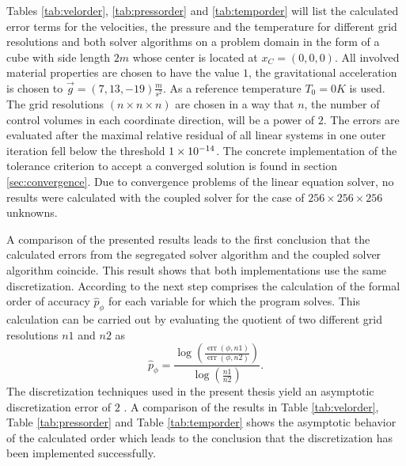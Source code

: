 Tables \ref{tab:velorder}, \ref{tab:pressorder} and \ref{tab:temporder} will list the calculated error terms for the velocities, the pressure and the temperature for different grid resolutions and both solver algorithms on a problem domain in the form of a cube with side length \(2m\) whose center is located at \(x_C = \left(0,0,0\right) \). All involved material properties are chosen to have the value \(1\), the gravitational acceleration is chosen to \(\textstyle \vec{g} = \left(7,13,-19\right)\frac{m}{s^2}\). As a reference temperature \(T_0 = 0K\) is used. The grid resolutions \((n \times n \times n)\) are chosen in a way that \(n\), the number of control volumes in each coordinate direction, will be a power of \(2\). The errors are evaluated after the maximal relative residual of all linear systems in one outer iteration fell below the threshold \(1\times 10^{-14}\). The concrete implementation of the tolerance criterion to accept a converged solution is found in section \ref{sec:convergence}. Due to convergence problems of the linear equation solver, no results were calculated with the coupled solver for the case of \(256 \times 256 \times 256 \) unknowns.

A comparison of the presented results leads to the first conclusion that the calculated errors from the segregated solver algorithm and the coupled solver algorithm coincide. This result shows that both implementations use the same discretization. According to \cite{salari00} the next step comprises the calculation of the formal order of accuracy \(\hat{p}_\phi\) for each variable for which the program solves. This calculation can be carried out by evaluating the quotient of two different grid resolutions \(n1\) and \(n2\) as 
\begin{displaymath}
  \hat{p}_{\phi} = \frac{\log\left(\frac{\operatorname{err}(\phi,{n1})}{\operatorname{err}(\phi,{n2})}\right)}{\log\left(\frac{n1}{n2}\right)}.
\end{displaymath}
The discretization techniques used in the present thesis yield an asymptotic discretization error of \(2\) \cite{schaefer99}. A comparison of the results in Table \ref{tab:velorder}, Table \ref{tab:pressorder} and Table \ref{tab:temporder} shows the asymptotic behavior of the calculated order which leads to the conclusion that the discretization has been implemented successfully.

